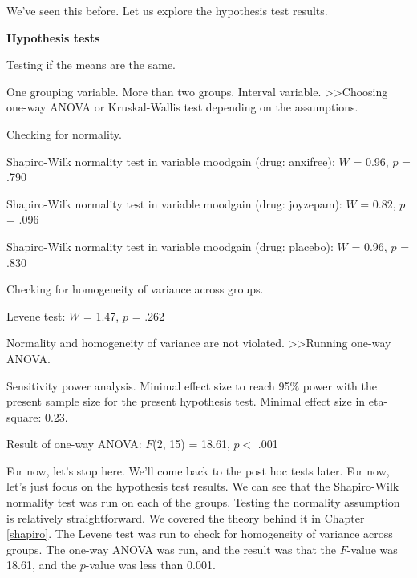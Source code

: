 \documentclass[
]{book}
\theoremstyle{definition}
\theoremstyle{definition}
\theoremstyle{definition}
\theoremstyle{definition}
\theoremstyle{remark}
\begin{document}
We've seen this before. Let us explore the hypothesis test results.

\begin{tcolorbox}[colback=white,
  colframe=lightgray,
  coltext=black,
  boxsep=4pt,
  boxrule=0.3pt,
  arc=0pt]
  {   \sffamily
      \color{CSblue}\textbf{Hypothesis tests}
      
      \color{CSgreen}Testing if the means are the same.
      
      One grouping variable. More than two groups. Interval variable.  \textgreater\textgreater  Choosing one-way ANOVA or Kruskal-Wallis test depending on the assumptions.

      Checking for normality.

      \color{black}
      Shapiro-Wilk normality test in variable mood\textunderscore gain (drug: anxifree): $W$ = 0.96, $p$ = .790

      Shapiro-Wilk normality test in variable mood\textunderscore gain (drug: joyzepam): $W$ = 0.82, $p$ = .096

      Shapiro-Wilk normality test in variable mood\textunderscore gain (drug: placebo): $W$ = 0.96, $p$ = .830

      \color{CSgreen}
      Checking for homogeneity of variance across groups.

      \color{black}
      Levene test: $W$ = 1.47, $p$ = .262

      \color{CSgreen}
      Normality and homogeneity of variance are not violated. \textgreater\textgreater Running one-way ANOVA.

      \color{black}
      Sensitivity power analysis. Minimal effect size to reach 95\% power with the present sample size for the present hypothesis test. Minimal effect size in eta-square: 0.23.

      Result of one-way ANOVA: $F$(2, 15) = 18.61, $p <$ .001
      \normalfont
  }
\end{tcolorbox}

For now, let's stop here. We'll come back to the post hoc tests later. For now, let's just focus on the hypothesis test results. We can see that the Shapiro-Wilk normality test was run on each of the groups. Testing the normality assumption is relatively straightforward. We covered the theory behind it in Chapter \ref{shapiro}. The Levene test was run to check for homogeneity of variance across groups. The one-way ANOVA was run, and the result was that the \(F\)-value was 18.61, and the \(p\)-value was less than 0.001.
\end{document}
